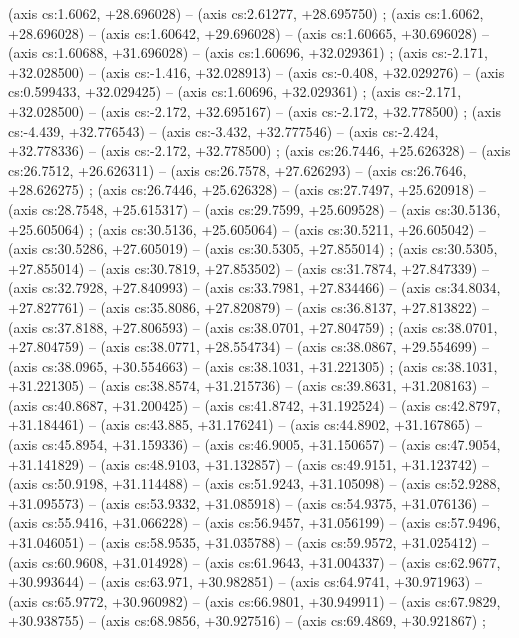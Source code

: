     (axis cs:1.6062,    +28.696028) --  (axis cs:2.61277,    +28.695750) ;
    (axis cs:1.6062,    +28.696028) --  (axis cs:1.60642,    +29.696028) --  (axis cs:1.60665,    +30.696028) --  (axis cs:1.60688,    +31.696028) --  (axis cs:1.60696,    +32.029361) ;
    (axis cs:-2.171,    +32.028500) --  (axis cs:-1.416,    +32.028913) --  (axis cs:-0.408,    +32.029276) --  (axis cs:0.599433,    +32.029425) --  (axis cs:1.60696,    +32.029361) ;
    (axis cs:-2.171,    +32.028500) --  (axis cs:-2.172,    +32.695167) --  (axis cs:-2.172,    +32.778500) ;
    (axis cs:-4.439,    +32.776543) --  (axis cs:-3.432,    +32.777546) --  (axis cs:-2.424,    +32.778336) --  (axis cs:-2.172,    +32.778500) ;
    (axis cs:26.7446,    +25.626328) --  (axis cs:26.7512,    +26.626311) --  (axis cs:26.7578,    +27.626293) --  (axis cs:26.7646,    +28.626275) ;
    (axis cs:26.7446,    +25.626328) --  (axis cs:27.7497,    +25.620918) --  (axis cs:28.7548,    +25.615317) --  (axis cs:29.7599,    +25.609528) --  (axis cs:30.5136,    +25.605064) ;
    (axis cs:30.5136,    +25.605064) --  (axis cs:30.5211,    +26.605042) --  (axis cs:30.5286,    +27.605019) --  (axis cs:30.5305,    +27.855014) ;
    (axis cs:30.5305,    +27.855014) --  (axis cs:30.7819,    +27.853502) --  (axis cs:31.7874,    +27.847339) --  (axis cs:32.7928,    +27.840993) --  (axis cs:33.7981,    +27.834466) --  (axis cs:34.8034,    +27.827761) --  (axis cs:35.8086,    +27.820879) --  (axis cs:36.8137,    +27.813822) --  (axis cs:37.8188,    +27.806593) --  (axis cs:38.0701,    +27.804759) ;
    (axis cs:38.0701,    +27.804759) --  (axis cs:38.0771,    +28.554734) --  (axis cs:38.0867,    +29.554699) --  (axis cs:38.0965,    +30.554663) --  (axis cs:38.1031,    +31.221305) ;
    (axis cs:38.1031,    +31.221305) --  (axis cs:38.8574,    +31.215736) --  (axis cs:39.8631,    +31.208163) --  (axis cs:40.8687,    +31.200425) --  (axis cs:41.8742,    +31.192524) --  (axis cs:42.8797,    +31.184461) --  (axis cs:43.885,    +31.176241) --  (axis cs:44.8902,    +31.167865) --  (axis cs:45.8954,    +31.159336) --  (axis cs:46.9005,    +31.150657) --  (axis cs:47.9054,    +31.141829) --  (axis cs:48.9103,    +31.132857) --  (axis cs:49.9151,    +31.123742) --  (axis cs:50.9198,    +31.114488) --  (axis cs:51.9243,    +31.105098) --  (axis cs:52.9288,    +31.095573) --  (axis cs:53.9332,    +31.085918) --  (axis cs:54.9375,    +31.076136) --  (axis cs:55.9416,    +31.066228) --  (axis cs:56.9457,    +31.056199) --  (axis cs:57.9496,    +31.046051) --  (axis cs:58.9535,    +31.035788) --  (axis cs:59.9572,    +31.025412) --  (axis cs:60.9608,    +31.014928) --  (axis cs:61.9643,    +31.004337) --  (axis cs:62.9677,    +30.993644) --  (axis cs:63.971,    +30.982851) --  (axis cs:64.9741,    +30.971963) --  (axis cs:65.9772,    +30.960982) --  (axis cs:66.9801,    +30.949911) --  (axis cs:67.9829,    +30.938755) --  (axis cs:68.9856,    +30.927516) --  (axis cs:69.4869,    +30.921867) ;
